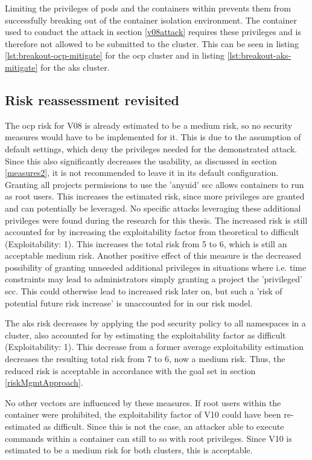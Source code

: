 Limiting the privileges of pods and the containers within prevents them from successfully breaking out of the container isolation environment.
The container used to conduct the attack in section \ref{v08attack} requires these privileges and is therefore not allowed to be submitted to the cluster. This can be seen in listing \ref{lst:breakout-ocp-mitigate} for the \gls{ocp} cluster and in listing \ref{lst:breakout-aks-mitigate} for the \gls{aks} cluster.

\subsection{Risk reassessment revisited} \label{reassess2}

The \gls{ocp} risk for V08 is already estimated to be a medium risk, so no security measures would have to be implemented for it. This is due to the assumption of default settings, which deny the privileges needed for the demonstrated attack. Since this also significantly decreases the usability, as discussed in section \ref{measures2}, it is not recommended to leave it in its default configuration.
Granting all projects permissions to use the 'anyuid' \gls{scc} allows containers to run as root users. This increases the estimated risk, since more privileges are granted and can potentially be leveraged. No specific attacks leveraging these additional privileges were found during the research for this thesis. The increased risk is still accounted for by increasing the exploitability factor from theoretical to difficult (Exploitability: 1). This increases the total risk from 5 to 6, which is still an acceptable medium risk. Another positive effect of this measure is the decreased possibility of granting unneeded additional privileges in situations where i.e. time constraints may lead to administrators simply granting a project the 'privileged' \gls{scc}. This could otherwise lead to increased risk later on, but such a 'risk of potential future risk increase' is unaccounted for in our risk model.

The \gls{aks} risk decreases by applying the pod security policy to all namespaces in a cluster, also accounted for by estimating the exploitability factor as difficult (Exploitability: 1). This decrease from a former average exploitability estimation decreases the resulting total risk from 7 to 6, now a medium risk.
Thus, the reduced risk is acceptable in accordance with the goal set in section \ref{riskMgmtApproach}.

No other vectors are influenced by these measures. If root users within the container were prohibited, the exploitability factor of V10 could have been re-estimated as difficult. Since this is not the case, an attacker able to execute commands within a container can still to so with root privileges. Since V10 is estimated to be a medium risk for both clusters, this is acceptable.

